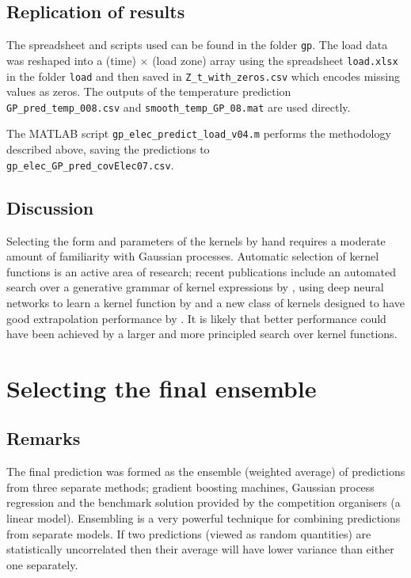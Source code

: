 \documentclass[preprint,authoryear,12pt]{elsarticle}
\begin{document}
\subsection{Replication of results}

The spreadsheet and scripts used can be found in the folder \texttt{gp}.
The load data was reshaped into a (time) $\times$ (load zone) array using the spreadsheet \texttt{load.xlsx} in the folder \texttt{load} and then saved in \texttt{Z\_t\_with\_zeros.csv} which encodes missing values as zeros.
The outputs of the temperature prediction \texttt{GP\_pred\_temp\_008.csv} and \texttt{smooth\_temp\_GP\_08.mat} are used directly.

The MATLAB script \texttt{gp\_elec\_predict\_load\_v04.m} performs the methodology described above, saving the predictions to\\ \texttt{gp\_elec\_GP\_pred\_covElec07.csv}.

\subsection{Discussion}

Selecting the form and parameters of the kernels by hand requires a moderate amount of familiarity with Gaussian processes.
Automatic selection of kernel functions is an active area of research; recent publications include an automated search over a generative grammar of kernel expressions by \cite{duvenaud2013structure}, using deep neural networks to learn a kernel function by \cite{salakhutdinov2008using} and a new class of kernels designed to have good extrapolation performance by \cite{wilson2013gaussian}.
It is likely that better performance could have been achieved by a larger and more principled search over kernel functions.

\section{Selecting the final ensemble}

\subsection{Remarks}

The final prediction was formed as the ensemble (weighted average) of predictions from three separate methods; gradient boosting machines, Gaussian process regression and the benchmark solution provided by the competition organisers (a linear model).
Ensembling is a very powerful technique for combining predictions from separate models.
If two predictions (viewed as random quantities) are statistically uncorrelated then their average will have lower variance than either one separately.
\end{document}
